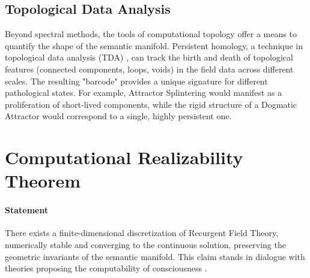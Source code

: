 \subsection{Topological Data Analysis}

Beyond spectral methods, the tools of computational topology offer a means to quantify the shape of the semantic manifold. Persistent homology, a technique in topological data analysis (TDA) \autocite{EdelsbrunnerHarer2010}, can track the birth and death of topological features (connected components, loops, voids) in the field data across different scales. The resulting "barcode" provides a unique signature for different pathological states. For example, Attractor Splintering would manifest as a proliferation of short-lived components, while the rigid structure of a Dogmatic Attractor would correspond to a single, highly persistent one.

\section{Computational Realizability Theorem}

\paragraph{Statement}
There exists a finite-dimensional discretization of Recurgent Field Theory, numerically stable and converging to the continuous solution, preserving the geometric invariants of the semantic manifold. This claim stands in dialogue with theories proposing the computability of consciousness \autocite{KochConsciousness2019}.

